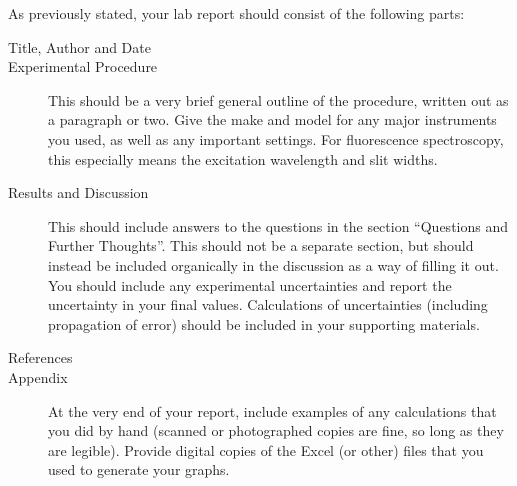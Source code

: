 As previously stated, your lab report should consist of the following parts:
\begin{description}
	\item[Title, Author and Date]
	\item[Experimental Procedure] This should be a very brief general outline of the procedure, written out as a paragraph or two. Give the make and model for any major instruments you used, as well as any important settings. For fluorescence spectroscopy, this especially means the excitation wavelength and slit widths.
	\item[Results and Discussion] This should include answers to the questions in the section ``Questions and Further Thoughts''. This should not be a separate section, but should instead be included organically in the discussion as a way of filling it out. You should include any experimental uncertainties and report the uncertainty in your final values. Calculations of uncertainties (including propagation of error) should be included in your supporting materials. 
	\item[References]
	\item[Appendix] At the very end of your report, include examples of any calculations that you did by hand (scanned or photographed copies are fine, so long as they are legible). 
	Provide digital copies of the Excel (or other) files that you used to generate your graphs.
\end{description}
